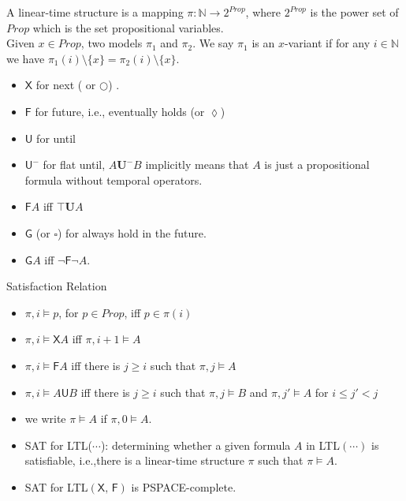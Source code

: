 \documentclass[12pt]{article}
\begin{document}
\begin{CJK*}{GBK}{song}
A linear-time structure is a mapping $\pi:\mathbb{N}\rightarrow 2^{Prop}$, where $2^{Prop}$ is the power set of $Prop$ which is the set propositional variables. \\

Given $x\in Prop$, two models $\pi_1$ and $\pi_2$. We say $\pi_1$ is an $x$-variant if for any $i\in\mathbb{N}$ we have $\pi_1(i)\setminus\{x\}=\pi_2(i)\setminus\{x\}$.

\begin{itemize}
\item $\textsf{X}$ for next ( or $\bigcirc$) .
\item $\textsf{F}$ for future, i.e., eventually holds (or $\lozenge$)
\item $\textsf{U}$ for until
\item $\textsf{U}^-$ for flat until, $A\mathbf{U}^-B$ implicitly means that $A$ is just a propositional formula without temporal operators.

\item $\textsf{F}A$ iff $\top\mathbf{U}A$

\item $\textsf{G}$ (or $\square$) for always hold in the future.
\item $\textsf{G}A$ iff $\neg \textsf{F}\neg A$.
\end{itemize}

Satisfaction Relation
\begin{itemize}
\item $\pi, i\models p$, for $p\in Prop$, iff $p\in \pi(i)$
 \item $\pi, i\models \textsf{X}A$ iff $\pi,i+1\models A$
 \item $\pi,i\models \textsf{F}A$ iff there is $j\geq i$ such that $\pi,j\models A$
 \item $\pi,i\models A\textsf{U} B$ iff there is $j\geq i$ such that $\pi,j\models B$ and $\pi,j'\models A$ for $i\leq j'<j$
\item we write $\pi\models A$ if $\pi,0\models A$.

\item SAT for LTL($\cdots$): determining whether a given formula $A$ in LTL$(\cdots)$ is satisfiable, i.e.,there is a linear-time structure $\pi$ such that $\pi\models A$.

\end{itemize}





\begin{itemize}
\item SAT for LTL$(\textsf{X, F})$ is PSPACE-complete.


\end{itemize}
\end{CJK*}
\end{document}
